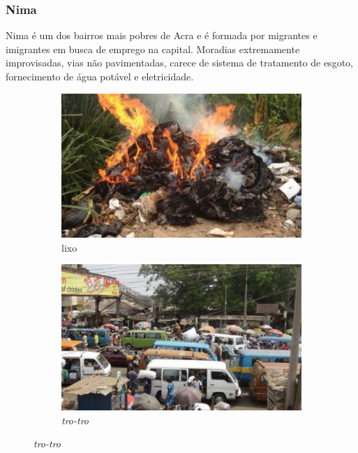 \begin{frame}
	\frametitle{Nima}
	  Nima é um dos bairros mais pobres de Acra e é formada por migrantes e imigrantes em busca de emprego na capital.
	  Moradias extremamente improvisadas, vias não pavimentadas, carece de 
	  sistema de tratamento de esgoto, fornecimento de água potável e eletricidade. 
	 
	\begin{figure}[H]
		\centering
		\begin{subfigure}[b]{0.4\linewidth}
			 \includegraphics[width=1\linewidth]{../../inputs/images/zheng/arku3.jpeg}
			\caption{lixo}
		\end{subfigure}%
		\hspace{0.5cm}
		\begin{subfigure}[b]{0.4\linewidth}
			 \includegraphics[width=1\linewidth]{../../inputs/images/zheng/arku4.jpeg}
			\caption{\textit{tro-tro}}
		\end{subfigure}
	\end{figure}
\end{frame}

